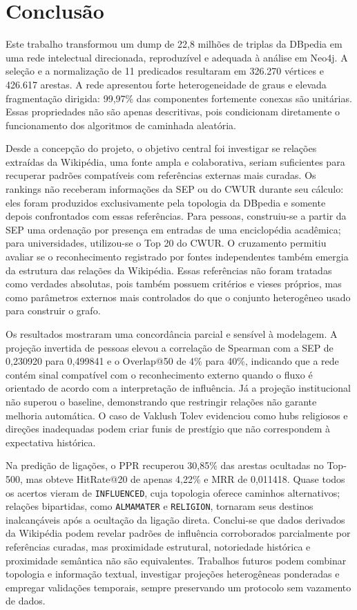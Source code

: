 \documentclass[10pt,a4paper]{article}
\begin{document}
\section{Conclusão}

Este trabalho transformou um dump de 22,8 milhões de triplas da DBpedia em uma rede intelectual direcionada, reproduzível e adequada à análise em Neo4j. A seleção e a normalização de 11 predicados resultaram em 326.270 vértices e 426.617 arestas. A rede apresentou forte heterogeneidade de graus e elevada fragmentação dirigida: 99,97\% das componentes fortemente conexas são unitárias. Essas propriedades não são apenas descritivas, pois condicionam diretamente o funcionamento dos algoritmos de caminhada aleatória.

Desde a concepção do projeto, o objetivo central foi investigar se relações extraídas da Wikipédia, uma fonte ampla e colaborativa, seriam suficientes para recuperar padrões compatíveis com referências externas mais curadas. Os rankings não receberam informações da SEP ou do CWUR durante seu cálculo: eles foram produzidos exclusivamente pela topologia da DBpedia e somente depois confrontados com essas referências. Para pessoas, construiu-se a partir da SEP uma ordenação por presença em entradas de uma enciclopédia acadêmica; para universidades, utilizou-se o Top 20 do CWUR. O cruzamento permitiu avaliar se o reconhecimento registrado por fontes independentes também emergia da estrutura das relações da Wikipédia. Essas referências não foram tratadas como verdades absolutas, pois também possuem critérios e vieses próprios, mas como parâmetros externos mais controlados do que o conjunto heterogêneo usado para construir o grafo.

Os resultados mostraram uma concordância parcial e sensível à modelagem. A projeção invertida de pessoas elevou a correlação de Spearman com a SEP de 0,230920 para 0,499841 e o Overlap@50 de 4\% para 40\%, indicando que a rede contém sinal compatível com o reconhecimento externo quando o fluxo é orientado de acordo com a interpretação de influência. Já a projeção institucional não superou o baseline, demonstrando que restringir relações não garante melhoria automática. O caso de Vaklush Tolev evidenciou como hubs religiosos e direções inadequadas podem criar funis de prestígio que não correspondem à expectativa histórica.

Na predição de ligações, o PPR recuperou 30,85\% das arestas ocultadas no Top-500, mas obteve HitRate@20 de apenas 4,22\% e MRR de 0,011418. Quase todos os acertos vieram de \texttt{INFLUENCED}, cuja topologia oferece caminhos alternativos; relações bipartidas, como \texttt{ALMAMATER} e \texttt{RELIGION}, tornaram seus destinos inalcançáveis após a ocultação da ligação direta. Conclui-se que dados derivados da Wikipédia podem revelar padrões de influência corroborados parcialmente por referências curadas, mas proximidade estrutural, notoriedade histórica e proximidade semântica não são equivalentes. Trabalhos futuros podem combinar topologia e informação textual, investigar projeções heterogêneas ponderadas e empregar validações temporais, sempre preservando um protocolo sem vazamento de dados.
\end{document}

